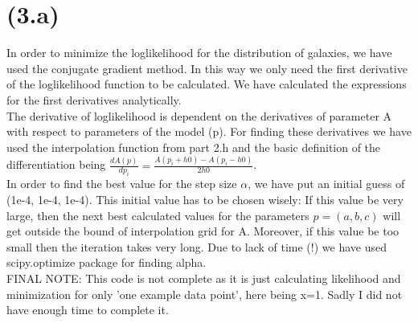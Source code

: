 \section{(3.a)}
In order to minimize the loglikelihood for the distribution of galaxies, we have used the conjugate gradient method. In this way we only need the first derivative of the loglikelihood function to be calculated. We have calculated the expressions for the first derivatives analytically. \\
The derivative of loglikelihood is dependent on the derivatives of parameter A with respect to parameters of the model (p). For finding these derivatives we have used the interpolation function from part 2.h and the basic definition of the differentiation being $\frac{dA(p)}{dp_{i}}= \frac{A(p_{i}+h0) -A(p_{i}-h0)}{2h0}$.\\
In order to find the best value for the step size $\alpha$, we have put an initial guess of (1e-4, 1e-4, 1e-4). This initial value has to be chosen wisely: If this value be very large, then the next best calculated values for the parameters $p = (a, b, c)$ will get outside the bound of interpolation grid for A. Moreover, if this value be too small then the iteration takes very long. Due to lack of time (!) we have used scipy.optimize package for finding alpha.\\
FINAL NOTE: This code is not complete as it is just calculating likelihood and minimization for only 'one example data point', here being x=1. Sadly I did not have enough time to complete it.


